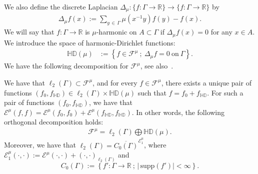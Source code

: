 \documentclass[10pt]{amsart}
\theoremstyle{definition}\newtheorem{defi}[theo]{Definition}\newtheorem{rema}[theo]{Remark}\newtheorem{exam}[theo]{Example}\newtheorem{exem}[theo]{Example}\newtheorem{nota}[theo]{Notation}
\newcommand{\ce}{\mathcal{E}}
\newcommand{\cf}{\mathcal{F}}
\newcommand{\br}{\mathbb{R}}
\newcommand{\bHD}{\mathbb{HD}}
\newcommand{\supp}{\mathrm{supp}}
\begin{document}
We also define the discrete Laplacian $\Delta_{\mu}:\{f:\Gamma\to\br\}\to
\{f:\Gamma\to\br\}$ by
\begin{align*}
\Delta_{\mu}f(x):=\sum_{y\,\in\,\Gamma}\mu\left(x^{-1}y\right)f(y)-f(x).
\end{align*}
We will say that $f:\Gamma\to\br$ is $\mu$-harmonic on $A\subset\Gamma$ if $\Delta_{\mu}f(x)=0$ for any $x\in A$. We introduce the space of harmonic-Dirichlet functions:
\begin{align*}
\bHD(\mu)&:=\left\{f\in\cf^{\mu}\ ;\ \Delta_{\mu}f=0\ \text{on}\ \Gamma\right\}.
\end{align*}
We have the following decomposition for $\cf^{\mu}$, see also~\cite[Theorem~3.69]{Soa}.

\begin{prop}\label{RD}
We have that $\ell_2(\Gamma)\subset\cf^{\mu}$, and for every $f\in\cf^{\mu}$, there exists a unique pair of functions $(f_0,f_{\bHD})\in\ell_2(\Gamma)\times\bHD(\mu)$ such that $f=f_0+f_{\bHD}$. For such a pair of functions $(f_0,f_{\bHD})$, we have that $\ce^{\mu}(f,f)=\ce^{\mu}(f_0,f_0) +\ce^{\mu}(f_{\bHD},f_{\bHD})$. In other words, the following orthogonal decomposition holds:
\begin{align}\label{royden}
\cf^\mu=\ell_2(\Gamma)\bigoplus\bHD(\mu).
\end{align}
Moreover, we have that $\ell_2(\Gamma)=\overline{C_0(\Gamma)}^{\ce^{\mu}_1}$, where $\ce^{\mu}_1(\cdot,\cdot):=\ce^{\mu}(\cdot,\cdot)+(\cdot,\cdot)_{\ell_2(\Gamma)}$ and
\[
C_0(\Gamma):=\left\{f':\Gamma\to\br\ ;\, |\,\supp(f')|<\infty\right\}.
\]
\end{prop}
\end{document}
